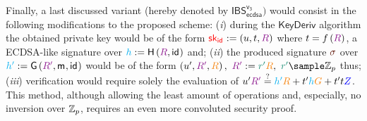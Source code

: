 \documentclass[version=submission, floatrow]{iacrcc}
\begin{document}
Finally, a last discussed variant (hereby denoted by $\mathsf{IBS}_{\mathsf{ecdsa}}^{\mathsf{v_{3}}})$ would consist in the following modifications to the proposed scheme: (\emph{i}) during the $\mathsf{KeyDeriv}$ algorithm the obtained private key would be of the form $\PrivKey{\sk_{\id{}}} := \left(u, t, \Commitment{R}\right)$ where $t = \ProjFunction{\Commitment{R}}$, a ECDSA-like signature over $\Digest{h} := \HashH{\Commitment{R}, \id{}}$ and; (\emph{ii}) the produced signature $\Signature{}$ over $\Digest{h'}:= \HashG{\Commitment{R'}, \msg{}, \id{}}$ would be of the form $\left(u', \Commitment{R'}, \Generator{R}\right),\ \Commitment{R'} := \Nonce{r'}\Generator{R},\ \Nonce{r'} \sample \Zp$ thus; (\emph{iii}) verification would require solely the evaluation of $u'\Commitment{R'} \overset{?}{=} \Digest{h'}\Generator{R} + t'\Digest{h}\GeneratorEC + t't\PubKey{Z}$. This method, although allowing the least amount of operations and, especially, no inversion over $\mathbb{Z}_{p}$, requires an even more convoluted security proof.
\end{document}
